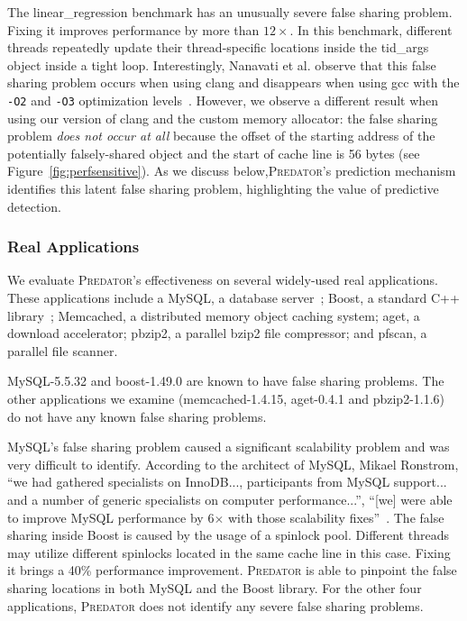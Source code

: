 \documentclass[10pt]{sigplanconf}
\newcommand{\Predator}{{\scshape Predator}}
\begin{document}
The linear\_regression benchmark has an unusually severe false sharing problem. Fixing it improves performance by more than $12\times$. In this benchmark, different threads repeatedly update their thread-specific locations inside the tid\_args object inside a tight loop. Interestingly, Nanavati et al. observe that this false sharing problem occurs when using clang and disappears when using gcc with the \texttt{-O2} and \texttt{-O3} optimization levels~\cite{OSdetection}. However, we observe a different result when using our version of clang and the custom memory allocator: the false sharing problem \emph{does not occur at all} because the offset of the starting address of the potentially falsely-shared object and the start of cache line is 56 bytes (see Figure~\ref{fig:perfsensitive}). As we discuss below,\Predator{}'s prediction mechanism identifies this latent false sharing problem, highlighting the value of predictive detection.

\subsubsection{Real Applications}
We evaluate \Predator{}'s effectiveness on several widely-used real applications. These applications include a MySQL, a database server~\cite{mysql};
Boost, a standard C++ library~\cite{libfalsesharing};
Memcached, a distributed memory object caching system; aget, a download accelerator;
pbzip2, a parallel bzip2 file compressor; and pfscan, a parallel file scanner.

MySQL-5.5.32 and boost-1.49.0 are known to have false sharing problems. The other applications we examine (memcached-1.4.15, aget-0.4.1 and pbzip2-1.1.6) do not have  any known false sharing problems.

MySQL's false sharing problem caused a significant scalability problem and was very difficult to identify.
According to the architect of MySQL, Mikael Ronstrom, ``we had gathered specialists on InnoDB..., participants from MySQL support... and a number of generic specialists on 
computer performance...'', ``[we] were able to improve MySQL performance by 6$\times$ with those scalability fixes''~\cite{mysql}. 
The false sharing inside Boost is caused by the usage of a spinlock pool. Different threads may utilize different spinlocks located in the same cache line in this case. Fixing it brings a 40\% performance improvement.
\Predator{} is able to pinpoint the false sharing locations in both MySQL and the Boost library. 
For the other four applications, \Predator{} does not identify any severe false sharing problems.
\end{document}
